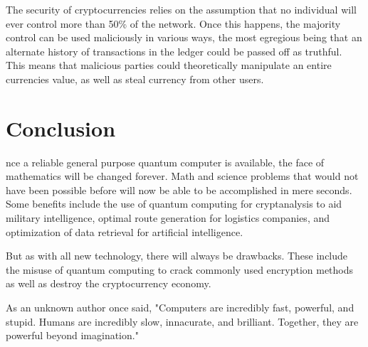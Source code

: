 \documentclass[10pt,journal,compsoc]{IEEEtran}
\begin{document}
The security of cryptocurrencies relies on the assumption that no individual will ever control more than 50\% of the network\cite{Futurism}. Once this happens, the majority control can be used maliciously in various ways, the most egregious being that an alternate history of transactions in the ledger could be passed off as truthful. This means that malicious parties could theoretically manipulate an entire currencies value, as well as steal currency from other users. 







\section{Conclusion}
nce a reliable general purpose quantum computer is available, the face of mathematics will be changed forever. Math and science problems that would not have been possible before will now be able to be accomplished in mere seconds. Some benefits include the use of quantum computing for cryptanalysis to aid military intelligence, optimal route generation for logistics companies, and optimization of data retrieval for artificial intelligence. 

But as with all new technology, there will always be drawbacks. These include the misuse of quantum computing to crack commonly used encryption methods as well as destroy the cryptocurrency economy.

As an unknown author once said, "Computers are incredibly fast, powerful, and stupid. Humans are incredibly slow, innacurate, and brilliant. Together, they are powerful beyond imagination."

\end{document}
